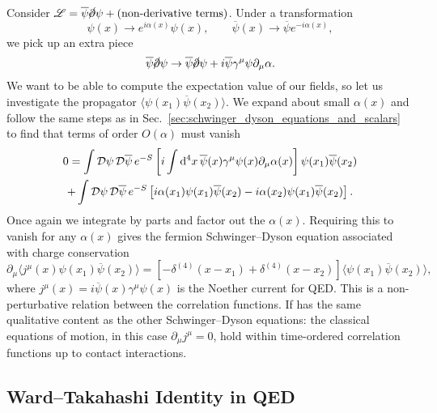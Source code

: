 Consider $\mathscr{L} = \overline{\psi}{} \cancel{\partial} \psi + (\text{non-derivative terms})$.
Under a transformation
\begin{equation}
  \psi(x) \to e^{i \alpha(x)} \psi(x), \qquad \overline{\psi}{}(x) \to \overline{\psi}{} e^{-i \alpha(x)},
\end{equation}
we pick up an extra piece
\begin{equation}
  \overline{\psi}{} \cancel{\partial} \psi \to \overline{\psi}{}\cancel{\partial} \psi + i \overline{\psi}{} \gamma^{\mu} \psi \partial_{\mu} \alpha.
\end{equation}
We want to be able to compute the expectation value of our fields, so let us investigate the propagator $\langle \psi(x_1) \overline{\psi}{}(x_2) \rangle$.
We expand about small $\alpha(x)$ and follow the same steps as in Sec.~\ref{sec:schwinger_dyson_equations_and_scalars} to find that terms of order $O(\alpha)$ must vanish
\begin{multline}
  0 = \int \mathop{\mathcal{D} \psi} \mathop{\mathcal{D} \overline{\psi}{}} e^{-S} \left[ i \int \dd[4]{x} \overline{\psi}{}(x) \gamma^{\mu} \psi(x) \partial_{\mu} \alpha(x) \right] \psi(x_1) \overline{\psi}{}(x_2) \\
  + \int \mathop{\mathcal{D} \psi} \mathop{\mathcal{D} \overline{\psi}{}} e^{-S} \left[ i \alpha(x_1) \psi(x_1) \overline{\psi}{}(x_2) - i \alpha(x_2) \psi(x_1) \overline{\psi}{}(x_2) \right].
\end{multline}
Once again we integrate by parts and factor out the $\alpha(x)$. Requiring this to vanish for any $\alpha(x)$ gives the fermion Schwinger--Dyson equation associated with charge conservation
\begin{equation}
  \label{eq:sd-qed}
  \partial_{\mu} \langle j^{\mu}(x) \psi(x_1) \overline{\psi}{}(x_2) \rangle = \left[ - \delta^{(4)}(x - x_1) + \delta^{(4)}(x - x_2) \right] \langle \psi(x_1) \overline{\psi}{}(x_2) \rangle,
\end{equation}
where $j^{\mu}(x) = i \overline{\psi}{}(x) \gamma^{\mu} \psi(x)$ is the Noether current for QED. This is a non-perturbative relation between the correlation functions.
If has the same qualitative content as the other Schwinger--Dyson equations: the classical equations of motion, in this case $\partial_{\mu} j^{\mu} = 0$, hold within time-ordered correlation functions up to contact interactions.

\subsection{Ward--Takahashi Identity in QED}%
\label{sub:ward_takahashi_identity_in_qed}

